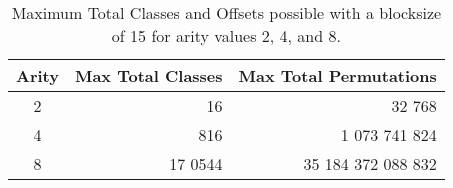 \begin{table}[h]
\begin{center}
\begin{tabular}{crr}
\toprule
Arity & \multicolumn{1}{c}{Max Total Classes} &
\multicolumn{1}{c}{Max Total Permutations}\\
\midrule
2 & 16 & 32 768\\
4 & 816 & 1 073 741 824\\
8 & 17 0544 & 35 184 372 088 832\\
\bottomrule
\end{tabular}
\caption{Maximum Total Classes and Offsets possible with a blocksize of 15 for arity 
    values 2, 4, and 8.}
\label{tab:maxclass}
\end{center}
\end{table}
